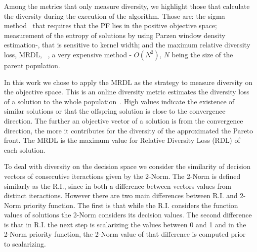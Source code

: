 Among the metrics that only measure diversity, we highlight those that calculate the diversity during the execution of the algorithm. Those are: the sigma method~\cite{mostaghim2003strategies} that requires that the PF lies in the positive objective space; measurement of the entropy of solutions by using Parzen window density estimation-\cite{tan2008evolutionary}, that is sensitive to kernel width; and the maximum relative diversity loss, MRDL, ~\cite{gee2015online}, a very expensive method - $O(N^2)$, $N$ being the size of the parent population.


%

In this work we chose to apply the MRDL as the strategy to measure diversity on the objective space. This is an online diversity metric estimates the diversity loss of a solution to the whole population~\cite{gee2015online}. High values indicate the existence of similar solutions or that the offspring solution is close to the convergence direction. The further an objective vector of a solution is from the convergence direction, the more it contributes for the diversity of the approximated the Pareto front. The MRDL is the maximum value for Relative Diversity Loss (RDL) of each solution.

To deal with diversity on the decision space we consider the similarity of decision vectors of consecutive iteractions given by the 2-Norm. The 2-Norm is defined similarly as the R.I., since in both a difference between vectors values from distinct iteractions. However there are two main differences between R.I. and 2-Norm priority function. The first is that while the R.I. considers the function values of solutions the 2-Norm considers its decision values. The second difference is that in R.I. the next step is scalarizing the values between 0 and 1 and in the 2-Norm priority function, the 2-Norm value of that difference is computed prior to scalarizing. 







